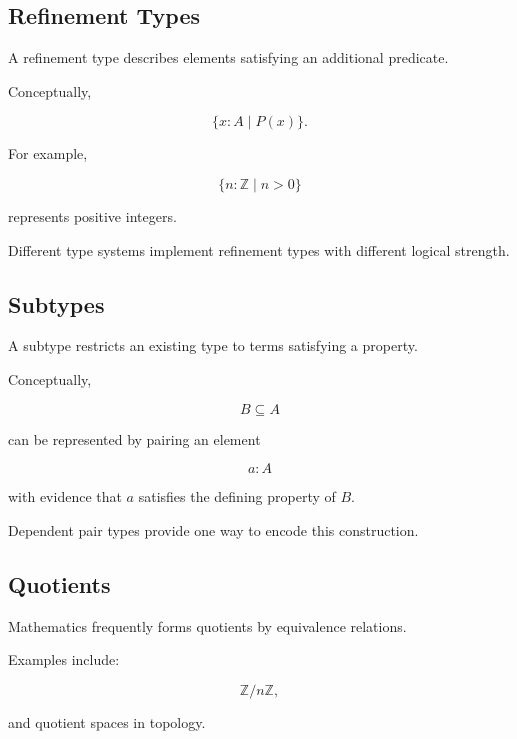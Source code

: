 \subsection{Refinement Types}
\label{subsec:refinement-types}

A refinement type describes elements satisfying an additional predicate.

Conceptually,

\[
\boxed{
\{x:A\mid P(x)\}.
}
\]

For example,

\[
\boxed{
\{n:\mathbb{Z}\mid n>0\}
}
\]

represents positive integers.

Different type systems implement refinement types with different logical
strength.

\subsection{Subtypes}
\label{subsec:type-theory-subtypes}

A subtype restricts an existing type to terms satisfying a property.

Conceptually,

\[
B
\subseteq
A
\]

can be represented by pairing an element

\[
a:A
\]

with evidence that \(a\) satisfies the defining property of \(B\).

Dependent pair types provide one way to encode this construction.

\subsection{Quotients}
\label{subsec:type-theory-quotients}

Mathematics frequently forms quotients by equivalence relations.

Examples include:

\[
\boxed{
\mathbb{Z}/n\mathbb{Z},
}
\]

and quotient spaces in topology.

